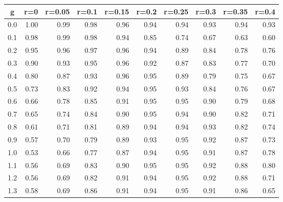 %
\begin{table}[!tbp]
 \begin{center}
 \begin{tabular}{rrrrrrrrrr}\hline\hline
\multicolumn{1}{c}{g}&\multicolumn{1}{c}{r=0}&\multicolumn{1}{c}{r=0.05}&\multicolumn{1}{c}{r=0.1}&\multicolumn{1}{c}{r=0.15}&\multicolumn{1}{c}{r=0.2}&\multicolumn{1}{c}{r=0.25}&\multicolumn{1}{c}{r=0.3}&\multicolumn{1}{c}{r=0.35}&\multicolumn{1}{c}{r=0.4}\tabularnewline
\hline
0.0&1.00&0.99&0.98&0.96&0.94&0.94&0.93&0.94&0.93\tabularnewline
0.1&0.98&0.99&0.98&0.94&0.85&0.74&0.67&0.63&0.60\tabularnewline
0.2&0.95&0.96&0.97&0.96&0.94&0.89&0.84&0.78&0.76\tabularnewline
0.3&0.90&0.93&0.95&0.96&0.92&0.87&0.83&0.77&0.70\tabularnewline
0.4&0.80&0.87&0.93&0.96&0.95&0.89&0.79&0.75&0.67\tabularnewline
0.5&0.73&0.83&0.92&0.94&0.95&0.93&0.84&0.76&0.67\tabularnewline
0.6&0.66&0.78&0.85&0.91&0.95&0.95&0.90&0.79&0.68\tabularnewline
0.7&0.65&0.74&0.84&0.90&0.95&0.94&0.90&0.82&0.71\tabularnewline
0.8&0.61&0.71&0.81&0.89&0.94&0.94&0.93&0.82&0.74\tabularnewline
0.9&0.57&0.70&0.79&0.89&0.93&0.95&0.92&0.87&0.73\tabularnewline
1.0&0.53&0.66&0.77&0.87&0.94&0.95&0.91&0.87&0.78\tabularnewline
1.1&0.56&0.69&0.83&0.90&0.95&0.95&0.92&0.88&0.80\tabularnewline
1.2&0.56&0.69&0.82&0.91&0.94&0.95&0.92&0.88&0.71\tabularnewline
1.3&0.58&0.69&0.86&0.91&0.94&0.95&0.91&0.86&0.65\tabularnewline
\hline
\end{tabular}

\end{center}

\end{table}

